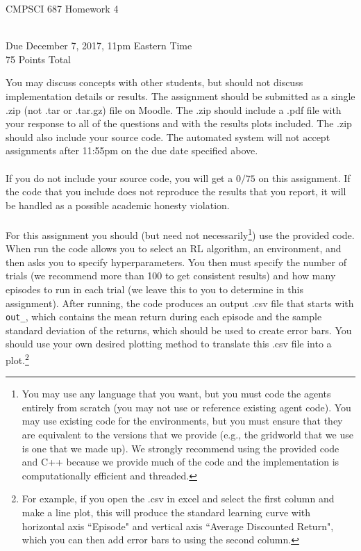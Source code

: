 \documentclass{article}
\begin{document}
\begin{center}
    \begin{Large}
    CMPSCI 687 Homework 4
    \end{Large}
    \\
    Due December 7, 2017, 11pm Eastern Time
    \\
    75 Points Total
\end{center}

 You may discuss concepts with other students, but should not discuss implementation details or results. The assignment should be submitted as a single .zip (not .tar or .tar.gz) file on Moodle. The .zip should include a .pdf file with your response to all of the questions and with the results plots included. The .zip should also include your source code. The automated system will not accept assignments after 11:55pm on the due date specified above.
\\\\
If you do not include your source code, you will get a $0/75$ on this assignment. If the code that you include does not reproduce the results that you report, it will be handled as a possible academic honesty violation.
\\\\
For this assignment you should (but need not necessarily\footnote{You may use any language that you want, but you must code the agents entirely from scratch (you may not use or reference existing agent code). You may use existing code for the environments, but you must ensure that they are equivalent to the versions that we provide (e.g., the gridworld that we use is one that we made up). We strongly recommend using the provided code and C++ because we provide much of the code and the implementation is computationally efficient and threaded.}) use the provided code. When run the code allows you to select an RL algorithm, an environment, and then asks you to specify hyperparameters. You then must specify the number of trials (we recommend more than 100 to get consistent results) and how many episodes to run in each trial (we leave this to you to determine in this assignment). After running, the code produces an output .csv file that starts with \texttt{out\_}, which contains the mean return during each episode and the sample standard deviation of the returns, which should be used to create error bars. You should use your own desired plotting method to translate this .csv file into a plot.\footnote{For example, if you open the .csv in excel and select the first column and make a line plot, this will produce the standard learning curve with horizontal axis ``Episode" and vertical axis ``Average Discounted Return", which you can then add error bars to using the second column.}
\end{document}
